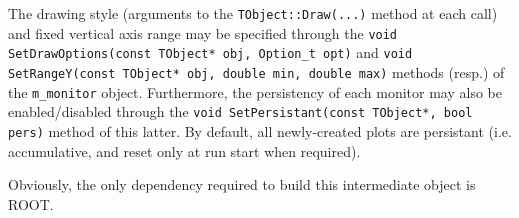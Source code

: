 The drawing style (arguments to the \lstinline[style=cpp]{TObject::Draw(...)} method at each call) and fixed vertical axis range may be specified through the \lstinline[style=cpp]{void SetDrawOptions(const TObject* obj, Option_t opt)} and \lstinline[style=cpp]{void SetRangeY(const TObject* obj, double min, double max)} methods (resp.) of the \lstinline[style=cpp]{m_monitor} object.
Furthermore, the persistency of each monitor may also be enabled/disabled through the \lstinline[style=cpp]{void SetPersistant(const TObject*, bool pers)} method of this latter.
By default, all newly-created plots are persistant (i.e. accumulative, and reset only at run start when required).

Obviously, the only dependency required to build this intermediate object is ROOT.
